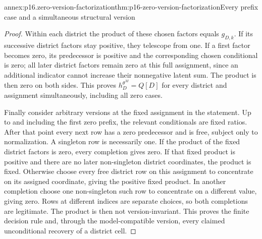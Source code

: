 \begin{annexitem}{annex:p16.zero-version-factorization}{thm:p16-zero-version-factorization}{Every prefix case and a simultaneous structural version}
\begin{proof}
Within each district the product of these chosen factors equals
\(g_{D,k}\). If its successive district factors stay positive,
they telescope from one. If a first factor becomes zero, its
predecessor is positive and the corresponding chosen conditional
is zero; all later district factors remain zero at this full
assignment, since an additional indicator cannot increase their
nonnegative latent sum. The product is then zero on both sides.
This proves \(h_D^{\theta^M}=Q[D]\) for every district and
assignment simultaneously, including all zero cases.

Finally consider arbitrary versions at the fixed assignment in
the statement. Up to and including the first zero prefix, the
relevant conditionals are fixed ratios. After that point every
next row has a zero predecessor and is free, subject only to
normalization. A singleton row is necessarily one. If the product
of the fixed district factors is zero, every completion gives
zero. If that fixed product is positive and there are no later
non-singleton district coordinates, the product is fixed. Otherwise
choose every free district row on this assignment to concentrate
on its assigned coordinate, giving the positive fixed product.
In another completion choose one non-singleton such row to
concentrate on a different value, giving zero. Rows at different
indices are separate choices, so both completions are legitimate.
The product is then not version-invariant. This proves the finite
decision rule and, through the model-compatible version, every
claimed unconditional recovery of a district cell.
\end{proof}
\end{annexitem}

